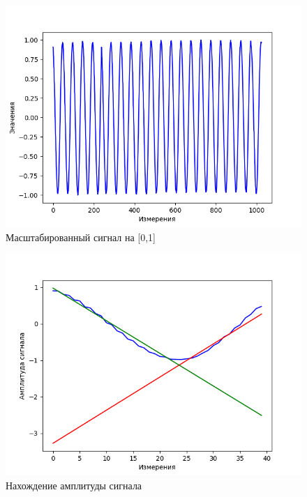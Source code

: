 \documentclass[12pt,a4paper]{article}
\begin{document}
\begin{figure}[H]
    \centering
    \includegraphics[scale=0.8]{images/one_scale.png}
    \caption{Масштабированный сигнал на [0,1]}
\end{figure}

\begin{figure}[H]
    \centering
    \includegraphics[scale=0.8]{images/amlitude.png}
    \caption{Нахождение амплитуды сигнала}
\end{figure}
\end{document}
